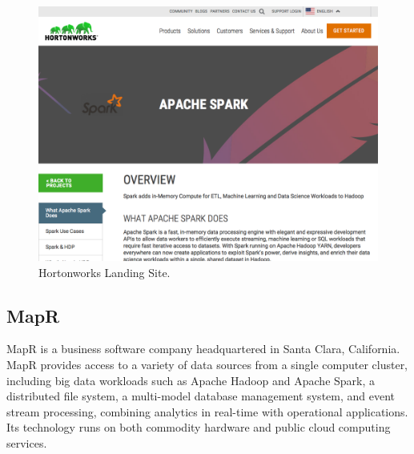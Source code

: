 \documentclass[]{book}
\theoremstyle{definition}
\theoremstyle{definition}
\theoremstyle{definition}
\theoremstyle{remark}
\begin{document}
\begin{figure}

{\centering \includegraphics[width=13.78in]{images/05-clusters-hortonworks} 

}

\caption{Hortonworks Landing Site.}\label{fig:hortonworks-spark}
\end{figure}

\hypertarget{mapr}{%
\subsection{MapR}\label{mapr}}

MapR is a business software company headquartered in Santa Clara,
California. MapR provides access to a variety of data sources from a
single computer cluster, including big data workloads such as Apache
Hadoop and Apache Spark, a distributed file system, a multi-model
database management system, and event stream processing, combining
analytics in real-time with operational applications. Its technology
runs on both commodity hardware and public cloud computing services.
\end{document}
